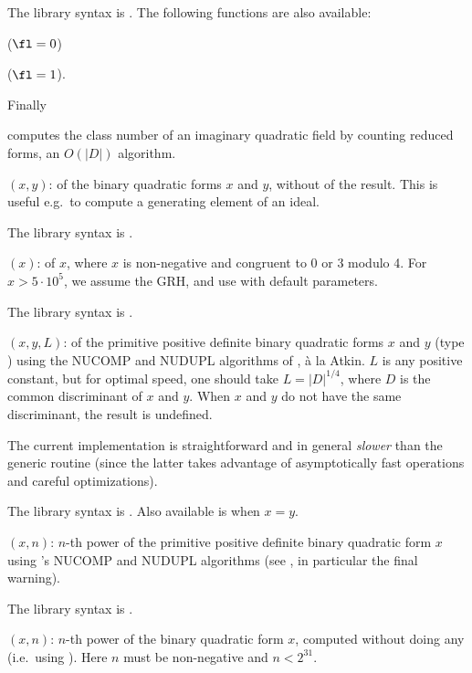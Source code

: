 The library syntax is .
The following functions are also available:

 ($\fl = 0$)

 ($\fl = 1$).

\noindent Finally

 computes the class number of an imaginary
quadratic field by counting reduced forms, an $O(|D|)$ algorithm.

$(x,y)$: \label{se:qfbcompraw} of the binary quadratic forms
$x$ and $y$, without  of the result. This is useful e.g.~to
compute a generating element of an ideal.

The library syntax is .

$(x)$: \label{se:qfbhclassno} of $x$, where
$x$ is non-negative and congruent to 0 or 3 modulo 4. For $x > 5\cdot
10^5$, we assume the GRH, and use  with default
parameters.

The library syntax is .

$(x,y,L)$: \label{se:qfbnucomp} of the primitive positive
definite binary quadratic forms $x$ and $y$ (type ) using the NUCOMP
and NUDUPL algorithms of , \`a la Atkin. $L$ is any positive
constant, but for optimal speed, one should take $L=|D|^{1/4}$, where $D$ is
the common discriminant of $x$ and $y$. When $x$ and $y$ do not have the same
discriminant, the result is undefined.

The current implementation is straightforward and in general \emph{slower}
than the generic routine (since the latter takes advantage of asymptotically
fast operations and careful optimizations).

The library syntax is .
Also available is  when $x=y$.

$(x,n)$: \label{se:qfbnupow}$n$-th power of the primitive positive definite
binary quadratic form $x$ using 's NUCOMP and NUDUPL algorithms
(see , in particular the final warning).

The library syntax is .

$(x,n)$: \label{se:qfbpowraw}$n$-th power of the binary quadratic form
$x$, computed without doing any  (i.e.~using ).
Here $n$ must be non-negative and $n<2^{31}$.

